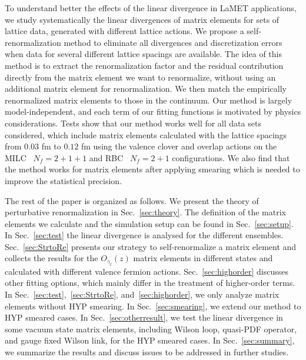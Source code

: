To understand better the effects of the linear divergence in LaMET applications, we study systematically the linear divergences of matrix elements for sets of lattice data, generated with different lattice actions. We propose a self-renormalization method to eliminate all divergences and discretization errors when data for several different lattice spacings are available. The idea of this method is to extract the renormalization factor and the residual contribution directly from the matrix element we want to renormalize, without using an additional matrix element for renormalization. We then match the empirically renormalized 
matrix elements to those in the continuum. Our method is largely model-independent, and each term of our fitting functions is motivated by physics considerations. Tests show that our method works well for all data sets considered, which include matrix elements calculated with the lattice spacings from $0.03$ fm to $0.12$ fm using the valence clover and overlap actions on the MILC~\cite{Bazavov:2012xda} $N_f=2+1+1$  and RBC~\cite{Blum:2014tka} $N_f=2+1$ configurations. We also find that the method works for matrix elements after applying smearing which is needed to improve the statistical precision.



The rest of the paper is organized as follows. We present the theory of perturbative renormalization in Sec.~\ref{sec:theory}. The definition of the matrix elements we calculate and the simulation setup can be found in Sec.~\ref{sec:setup}. In Sec.~\ref{sec:test} the linear divergence is analysed for the different ensembles. Sec.~\ref{sec:StrtoRe} presents our strategy to self-renormalize a matrix element and collects the results for the $O_{\gamma_t}(z)$ matrix elements in different states and calculated with different valence fermion actions. Sec.~\ref{sec:highorder} discusses other fitting options, which mainly differ in the treatment of higher-order terms. In Sec.~\ref{sec:test},~\ref{sec:StrtoRe}, and~\ref{sec:highorder}, we only analyze matrix elements without HYP smearing. In Sec.~\ref{sec:smearing}, we extend our method to HYP smeared cases. In Sec.~\ref{sec:otherresult}, we test the linear divergence in some vacuum state matrix elements, including Wilson loop, quasi-PDF operator, and gauge fixed Wilson link, for the HYP smeared cases. In Sec.~\ref{sec:summary}, we summarize the results and discuss issues to be addressed in further studies.
